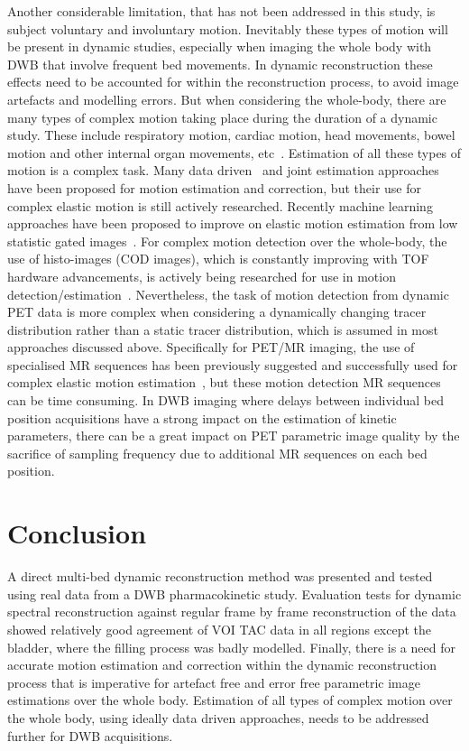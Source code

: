 Another considerable limitation, that has not been addressed in this study, is subject voluntary and involuntary motion. Inevitably these types of motion will be present in dynamic studies, especially when imaging the whole body with DWB that involve frequent bed movements. In dynamic reconstruction these effects need to be accounted for within the reconstruction process, to avoid image artefacts and modelling errors.
But when considering the whole-body, there are many types of complex motion taking place during the duration of a dynamic study. These include respiratory motion, cardiac motion, head movements, bowel motion and other internal organ movements, etc~\cite{Gallezot2019}. Estimation of all these types of motion is a complex task. Many data driven~\cite{Schleyer2015,Kesner2019,Lu2020} and joint estimation approaches~\cite{Bousse2017,Jiao2017} have been proposed for motion estimation and correction, but their use for complex elastic motion is still actively researched. Recently machine learning approaches have been proposed to improve on elastic motion estimation from low statistic gated images~\cite{Zhou2020,Zhou2021}. For complex motion detection over the whole-body, the use of histo-images (COD images), which is constantly improving with TOF hardware advancements, is actively being researched for use in motion detection/estimation~\cite{Panin1551}. 
Nevertheless, the task of motion detection from dynamic PET data is more complex when considering a dynamically changing tracer distribution rather than a static tracer distribution, which is assumed in most approaches discussed above.
Specifically for PET/MR imaging, the use of specialised MR sequences has been previously suggested and successfully used for complex elastic motion estimation~\cite{Tsoumpas2010,Catana2015}, but these motion detection MR sequences can be time consuming. In DWB imaging where delays between individual bed position acquisitions have a strong impact on the estimation of kinetic parameters, there can be a great impact on PET parametric image quality by the sacrifice of sampling frequency due to additional MR sequences on each bed position. 

\section{Conclusion}
A direct multi-bed dynamic reconstruction method was presented and tested using real data from a DWB pharmacokinetic study. Evaluation tests for dynamic spectral reconstruction against regular frame by frame reconstruction of the data showed relatively good agreement of VOI TAC data in all regions except the bladder, where the filling process was badly modelled. 
Finally, there is a need for accurate motion estimation and correction within the dynamic reconstruction process that is imperative for artefact free and error free parametric image estimations over the whole body.
Estimation of all types of complex motion over the whole body, using ideally data driven approaches, needs to be addressed further for DWB acquisitions.